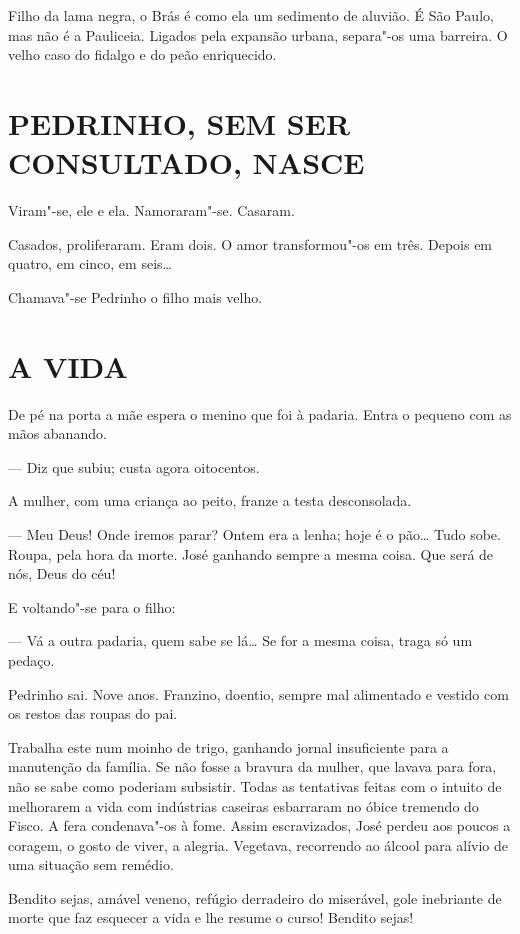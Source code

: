 Filho da lama negra, o Brás é como ela um sedimento de aluvião. É São
Paulo, mas não é a Pauliceia. Ligados pela expansão urbana, separa"-os
uma barreira. O velho caso do fidalgo e do peão enriquecido.

\section*{PEDRINHO, SEM SER CONSULTADO, NASCE}

Viram"-se, ele e ela. Namoraram"-se. Casaram.

Casados, proliferaram. Eram dois. O amor transformou"-os em três. Depois
em quatro, em cinco, em seis\ldots{}

Chamava"-se Pedrinho o filho mais velho.

\section*{A VIDA}

De pé na porta a mãe espera o menino que foi à padaria. Entra o pequeno
com as mãos abanando.

--- Diz que subiu; custa agora oitocentos.

A mulher, com uma criança ao peito, franze a testa desconsolada.

--- Meu Deus! Onde iremos parar? Ontem era a lenha; hoje é o pão\ldots{} Tudo
sobe. Roupa, pela hora da morte. José ganhando sempre a mesma coisa. Que
será de nós, Deus do céu!

E voltando"-se para o filho:

--- Vá a outra padaria, quem sabe se lá\ldots{} Se for a mesma coisa, traga
só um pedaço.

Pedrinho sai. Nove anos. Franzino, doentio, sempre mal alimentado e
vestido com os restos das roupas do pai.

Trabalha este num moinho de trigo, ganhando jornal insuficiente para a
manutenção da família. Se não fosse a bravura da mulher, que lavava para
fora, não se sabe como poderiam subsistir. Todas as tentativas feitas
com o intuito de melhorarem a vida com indústrias caseiras esbarraram no
óbice tremendo do Fisco. A fera condenava"-os à fome. Assim escravizados,
José perdeu aos poucos a coragem, o gosto de viver, a alegria. Vegetava,
recorrendo ao álcool para alívio de uma situação sem remédio.

Bendito sejas, amável veneno, refúgio derradeiro do miserável, gole
inebriante de morte que faz esquecer a vida e lhe resume o curso!
Bendito sejas!

